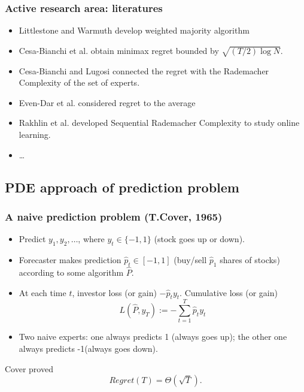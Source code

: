 \documentclass{beamer}
\begin{document}
\begin{frame}
\frametitle{Active research area: literatures}
\begin{itemize}
\item Littlestone and Warmuth develop {\color{blue}weighted majority algorithm}
\item Cesa-Bianchi et al. obtain minimax regret bounded by $\sqrt{(T/2)\log N}.$
\item Cesa-Bianchi and Lugosi connected the regret with the Rademacher Complexity of the set of experts.
\item Even-Dar et al. considered regret to the average

\item Rakhlin et al. developed {\color{blue}Sequential Rademacher Complexity} to study online learning.
\item \ldots
\end{itemize}


\end{frame}



\subsection{PDE approach of prediction problem}

\begin{frame}
\frametitle{A naive prediction problem (T.Cover, 1965)}
\begin{itemize}
\item Predict $y_1,y_2,\ldots$, where $y_t\in\{-1,1\}$ ({\color{blue}stock goes up or down}). 
\pause
\item Forecaster makes prediction $\hat{p}_t\in[-1,1]$ ({\color{blue}buy/sell $\hat{p}_1$ shares of stocks}) according to some algorithm $\hat{P}$. 
\pause
\item At each time $t$, investor loss (or gain) $-\hat{p}_ty_t$. Cumulative loss (or gain)
$$L(\hat{P},y_T) := -\sum_{t=1}^T\hat{p}_ty_t$$
\pause
\item Two naive experts: one always predicts 1 ({\color{blue}always goes up}); the other one always predicts -1({\color{blue}always goes down}).
\end{itemize}
Cover proved $$Regret(T) = \Theta(\sqrt{T}).$$

\end{frame}
\end{document}
